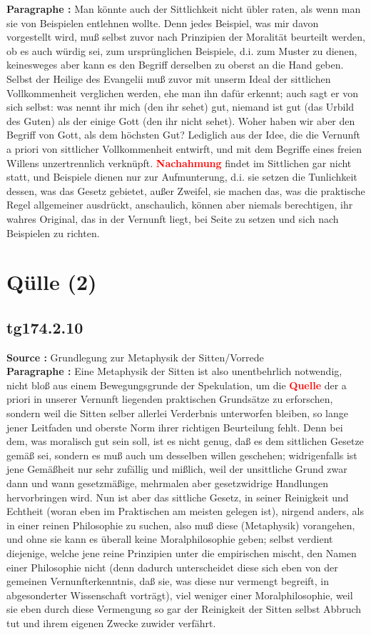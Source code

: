 \documentclass[a4paper,12pt,twoside]{book}
\newcommand{\match}[1]{\textcolor{red}{\textbf{#1}}}
\newcommand{\unnumberedsection}[1]{
	\section*{#1}
	\addcontentsline{toc}{section}{#1}
	\markright{#1}
}
\begin{document}
	\noindent\textbf{Paragraphe : }Man könnte auch der Sittlichkeit nicht übler raten, als wenn man sie von Beispielen entlehnen wollte. Denn jedes Beispiel, was mir davon vorgestellt wird, muß selbst zuvor nach Prinzipien der Moralität beurteilt werden, ob es auch würdig sei, zum ursprünglichen Beispiele, d.i. zum Muster zu dienen, keinesweges aber kann es den Begriff derselben zu oberst an die Hand geben. Selbst der Heilige des Evangelii muß zuvor mit unserm Ideal der sittlichen Vollkommenheit verglichen werden, ehe man ihn dafür erkennt; auch sagt er von sich selbst: was nennt ihr mich (den ihr sehet) gut, niemand ist gut (das Urbild des Guten) als der einige Gott (den ihr nicht sehet). Woher haben wir aber den Begriff von Gott, als dem höchsten Gut? Lediglich aus der Idee, die die Vernunft a priori von sittlicher Vollkommenheit entwirft, und mit dem Begriffe eines freien Willens unzertrennlich verknüpft. \match{Nachahmung} findet im Sittlichen gar nicht statt, und Beispiele dienen nur zur Aufmunterung, d.i. sie setzen die Tunlichkeit dessen, was das Gesetz gebietet, außer Zweifel, sie machen das, was die praktische Regel allgemeiner ausdrückt, anschaulich, können aber niemals  berechtigen, ihr wahres Original, das in der Vernunft liegt, bei Seite zu setzen und sich nach Beispielen zu richten. 
	
	\unnumberedsection{Qülle (2)} 
	\subsection*{tg174.2.10} 
	\textbf{Source : }Grundlegung zur Metaphysik der Sitten/Vorrede\\  
	
	\noindent\textbf{Paragraphe : }Eine Metaphysik der Sitten ist also unentbehrlich notwendig, nicht bloß aus einem Bewegungsgrunde der Spekulation, um die \match{Quelle} der a priori in unserer Vernunft liegenden praktischen Grundsätze zu erforschen, sondern weil die Sitten selber allerlei Verderbnis unterworfen bleiben, so lange jener Leitfaden und oberste Norm ihrer richtigen Beurteilung fehlt. Denn bei dem, was moralisch gut sein soll, ist es nicht genug, daß es dem sittlichen Gesetze gemäß sei, sondern es muß auch um desselben willen geschehen; widrigenfalls ist jene Gemäßheit nur sehr zufällig und mißlich, weil der unsittliche Grund zwar dann und wann gesetzmäßige, mehrmalen aber gesetzwidrige Handlungen hervorbringen wird. Nun ist aber das sittliche Gesetz, in seiner Reinigkeit und Echtheit (woran eben im Praktischen am meisten gelegen ist), nirgend anders, als in einer reinen Philosophie zu suchen, also muß diese (Metaphysik) vorangehen, und ohne sie kann es überall keine Moralphilosophie geben; selbst verdient diejenige, welche jene reine Prinzipien unter die empirischen mischt, den Namen einer Philosophie nicht (denn dadurch unterscheidet diese sich eben von der gemeinen Vernunfterkenntnis, daß sie, was diese nur vermengt begreift, in abgesonderter Wissenschaft vorträgt), viel weniger einer Moralphilosophie, weil sie eben durch diese Vermengung so gar der Reinigkeit der Sitten selbst Abbruch tut und ihrem eigenen Zwecke zuwider verfährt. 
	
\end{document}
